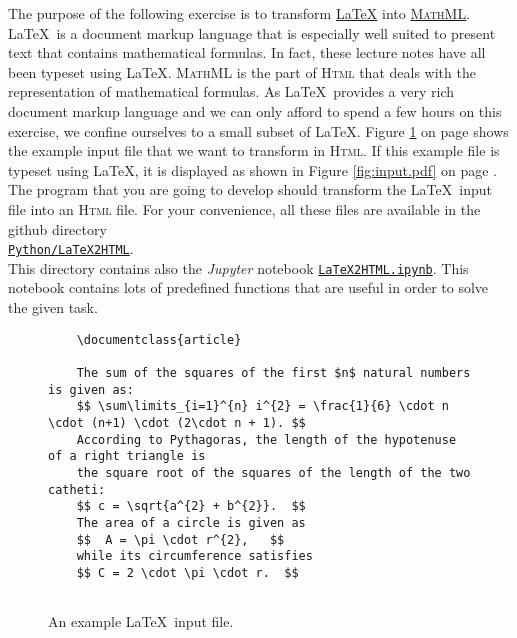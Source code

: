 \exerciseEng
The purpose of the following exercise is to transform \href{http://www.latex-project.org}{\LaTeX} into 
\href{https://www.tutorialspoint.com/mathml/index.htm}{\textsc{MathML}}.  \LaTeX\ is a document markup language
that is especially well suited to present text that contains mathematical formulas.  In fact, these
lecture notes have all been typeset using \LaTeX.  \textsc{MathML} is the part of \textsc{Html} that
deals with the representation of mathematical formulas.  As \LaTeX\ provides a very rich
document markup language and we can only afford to spend a few hours on this exercise, we confine
ourselves to a small subset of \LaTeX.  Figure \ref{fig:input.tex} on page \pageref{fig:input.tex}
shows the example input file that we want to transform in \textsc{Html}.  If this example file is
typeset using \LaTeX, it is displayed as shown in Figure \ref{fig:input.pdf} on page
\pageref{fig:input.pdf}.  The program that you are
going to develop should transform the \LaTeX\ input file into an \textsc{Html} file.  For your
convenience, all these files are available in the github directory 
\\[0.2cm]
\hspace*{1.3cm}
\href{https://github.com/karlstroetmann/Formal-Languages/tree/master/Python/Chapter-03/LaTeX2HTML}{\texttt{Python/LaTeX2HTML}}.
\\[0.2cm]
This directory contains also the \textsl{Jupyter} notebook 
\href{https://github.com/karlstroetmann/Formal-Languages/tree/master/Python/Chapter-03/LaTeX2HTML/LaTeX2HTML.ipynb}{\texttt{LaTeX2HTML.ipynb}}.
This notebook contains lots of predefined functions that are useful in order to solve the given task.

\begin{figure}[!ht]
  \centering
\begin{verbatim}
    \documentclass{article}
    
    The sum of the squares of the first $n$ natural numbers is given as:
    $$ \sum\limits_{i=1}^{n} i^{2} = \frac{1}{6} \cdot n \cdot (n+1) \cdot (2\cdot n + 1). $$
    According to Pythagoras, the length of the hypotenuse of a right triangle is
    the square root of the squares of the length of the two catheti:
    $$ c = \sqrt{a^{2} + b^{2}}.  $$
    The area of a circle is given as 
    $$  A = \pi \cdot r^{2},   $$ 
    while its circumference satisfies
    $$ C = 2 \cdot \pi \cdot r.  $$
    
    \end{verbatim}
  \caption{An example \LaTeX\ input file.}
  \label{fig:input.tex}
\end{figure}

